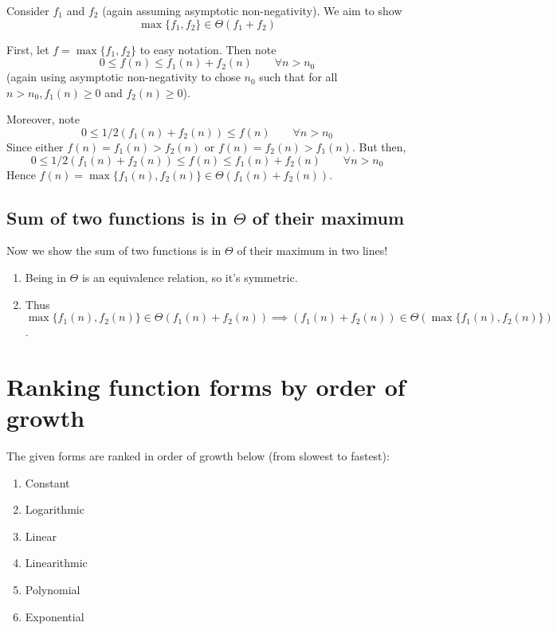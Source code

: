 \documentclass[paper=a4, fontsize=11pt]{scrartcl} %
\numberwithin{equation}{section} %
\numberwithin{figure}{section} %
\numberwithin{table}{section} %
\begin{document}
Consider $f_1$ and $f_2$ (again assuming asymptotic non-negativity). We aim to show
\[\max \{f_1, f_2\} \in \Theta(f_1 + f_2)\]

First, let $f =\max\{f_1, f_2\}$ to easy notation. Then note
\[0 \leq f(n) \leq f_1(n) + f_2(n) \qquad \forall n > n_0\]
(again using asymptotic non-negativity to chose $n_0$ such that for all $n>n_0, f_1(n) \geq 0$ and $f_2(n) \geq 0$).

Moreover, note
\[0 \leq 1/2 \left(f_1(n) +f_2(n)\right) \leq f(n) \qquad{} \forall n>n_0\]
Since either $f(n) = f_1(n) > f_2(n)$ or $f(n) = f_2(n) > f_1(n)$. But then,
\[0 \leq 1/2 \left(f_1(n) +f_2(n)\right) \leq f(n) \leq f_1(n) + f_2(n) \qquad \forall n > n_0\]
Hence $f(n) = \max\{f_1(n), f_2(n)\} \in \Theta\left(f_1(n) + f_2(n)\right)$.


\subsection{Sum of two functions is in $\Theta$ of their maximum}

Now we show the sum of two functions is in $\Theta$ of their maximum in two lines!
\begin{enumerate}
\item Being in $\Theta$ is an equivalence relation, so it's symmetric.
\item Thus $\max\{f_1(n), f_2(n)\} \in \Theta\left(f_1(n) + f_2(n)\right) \implies \left(f_1(n) + f_2(n)\right) \in \Theta(\max\{f_1(n), f_2(n)\})$.
\end{enumerate}


\section{Ranking function forms by order of growth}

The given forms are ranked in order of growth below (from slowest to fastest):
\begin{enumerate}
\item Constant
\item Logarithmic
\item Linear
\item Linearithmic
\item Polynomial
\item Exponential
\end{enumerate} 
\end{document}
